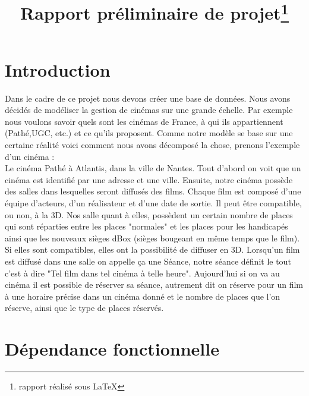 \documentclass[a4paper,sffamily,12pt]{article}
\title{\vspace{\fill}\LARGE\bfseries\sffamily Rapport préliminaire de projet\protect\footnote{rapport réalisé sous \LaTeX} \vspace{\fill}}
\begin{document}
	\date{} %
	\maketitle %

	\thispagestyle{fancy} %
	
	\newpage
			
	\renewcommand{\contentsname}{Sommaire}
	\tableofcontents
	
	\newpage
	
	\section{Introduction}
		
		\vspace{0.5cm}
		
		Dans le cadre de ce projet nous devons créer une base de données. Nous avons décidés de modéliser la gestion de cinémas sur une grande échelle. Par exemple nous voulons savoir quels sont les cinémas de France, à qui ils appartiennent (Pathé,UGC, etc.) et ce qu'ils proposent. Comme notre modèle se base sur une certaine réalité voici comment nous avons décomposé la chose, prenons  l'exemple d'un cinéma : \\
Le cinéma Pathé à Atlantis, dans la ville de Nantes. Tout d'abord on voit que un cinéma est identifié par une adresse et une ville. Ensuite, notre cinéma possède des salles dans lesquelles seront diffusés des films. Chaque film est composé d'une équipe d'acteurs, d'un réalisateur et d'une date de sortie. Il peut être compatible, ou non, à la 3D. Nos salle quant à elles, possèdent un certain nombre de places qui sont réparties entre les places "normales" et les places pour les handicapés ainsi que les nouveaux sièges dBox (sièges bougeant en même temps que le film). Si elles sont compatibles, elles ont la possibilité de diffuser en 3D. Lorsqu'un film est diffusé dans une salle on appelle ça une Séance, notre séance définit le tout c'est à dire "Tel film dans tel cinéma à telle heure". Aujourd'hui si on va au cinéma il est possible de réserver sa séance, autrement dit on réserve pour un film à une horaire précise dans un cinéma donné et le nombre de places que l'on réserve, ainsi que le type de places réservés. 
		
		\vspace{0.5cm}
				
	\section{Dépendance fonctionnelle}
	
\end{document}
